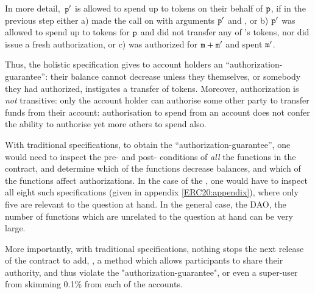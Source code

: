 In more detail,\  ${\mbox{\tt{p}}}'$ is allowed to spend 
up to  tokens on their behalf of ${\mbox{\tt{p}}}$, if in the   previous step either a)
  made the call  on  
with arguments ${\mbox{\tt{p}}}'$ and , or b)  
${\mbox{\tt{p}}}'$ was allowed to spend  up to  tokens for ${\mbox{\tt{p}}}$
and did not transfer any of 's tokens, nor did  issue a fresh authorization,
or c)  was authorized for ${\mbox{\tt{m}}}+{\mbox{\tt{m}}}'$ and spent ${\mbox{\tt{m}}}'$. 
  
  \vspace{.1cm}
 
 Thus, the holistic specification gives to account holders an
 ``authorization-guarantee'': their balance cannot decrease unless they
 themselves, or somebody they had authorized, instigates a transfer of
 tokens. Moreover, authorization is {\em not} transitive: only the
 account holder can authorise some other party to transfer funds from
 their account: authorisation to spend from an account does not confer
 the ability to authorise yet more others to spend also.
 
 
 With traditional  specifications, to obtain the ``authorization-guarantee'', 
one would need to inspect the pre- and post- conditions of {\em all} the functions
in the contract, and determine which of the functions decrease balances, and which of the functions 
 affect authorizations.
 In the case of the , one would have to inspect all eight such specifications
 (given in appendix \ref{ERC20:appendix}), 
 where only five are relevant to the question at hand.
 In the general case, \eg the DAO, the number of   functions which are unrelated
 to the question at hand can be very large.
  
More importantly, with traditional  specifications, nothing stops the next release of the contract to add, 
\eg, a method which allows participants to share their authority, and thus
violate the "authorization-guarantee", or even a super-user from skimming 0.1\% from each of the accounts.

